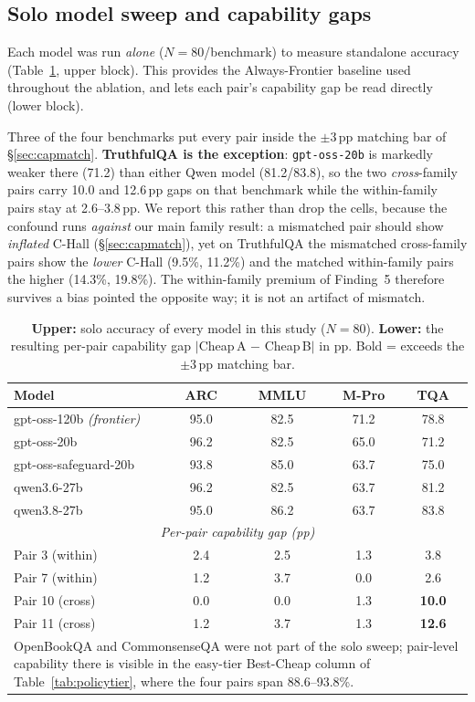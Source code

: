 \documentclass[conference]{IEEEtran}
\begin{document}
\subsection{Solo model sweep and capability gaps}
Each model was run \textit{alone} ($N=80$/benchmark) to measure standalone
accuracy (Table~\ref{tab:solo}, upper block). This provides the Always-Frontier
baseline used throughout the ablation, and lets each pair's capability gap be
read directly (lower block).

Three of the four benchmarks put every pair inside the $\pm3$\,pp matching bar of
\S\ref{sec:capmatch}. \textbf{TruthfulQA is the exception}: \texttt{gpt-oss-20b}
is markedly weaker there (71.2) than either Qwen model (81.2/83.8), so the two
\textit{cross}-family pairs carry 10.0 and 12.6\,pp gaps on that benchmark while
the within-family pairs stay at 2.6--3.8\,pp. We report this rather than drop the
cells, because the confound runs \textit{against} our main family result: a
mismatched pair should show \textit{inflated} C-Hall (\S\ref{sec:capmatch}), yet
on TruthfulQA the mismatched cross-family pairs show the \textit{lower} C-Hall
(9.5\%, 11.2\%) and the matched within-family pairs the higher (14.3\%, 19.8\%).
The within-family premium of Finding~5 therefore survives a bias pointed the
opposite way; it is not an artifact of mismatch.

\begin{table}[!t]
\caption{\textbf{Upper:} solo accuracy of every model in this study ($N=80$).
\textbf{Lower:} the resulting per-pair capability gap $|$Cheap\,A $-$ Cheap\,B$|$
in pp. Bold = exceeds the $\pm3$\,pp matching bar.}
\label{tab:solo}
\renewcommand{\arraystretch}{1.15}
\begin{tabular}{l c c c c}
\toprule
\textbf{Model} & \textbf{ARC} & \textbf{MMLU} & \textbf{M-Pro} & \textbf{TQA} \\
\midrule
gpt-oss-120b \textit{(frontier)} & 95.0 & 82.5 & 71.2 & 78.8 \\
\midrule
gpt-oss-20b & 96.2 & 82.5 & 65.0 & 71.2 \\
gpt-oss-safeguard-20b & 93.8 & 85.0 & 63.7 & 75.0 \\
qwen3.6-27b & 96.2 & 82.5 & 63.7 & 81.2 \\
qwen3.8-27b & 95.0 & 86.2 & 63.7 & 83.8 \\
\midrule
\multicolumn{5}{c}{\textit{Per-pair capability gap (pp)}} \\
\midrule
Pair 3 (within) & 2.4 & 2.5 & 1.3 & 3.8 \\
Pair 7 (within) & 1.2 & 3.7 & 0.0 & 2.6 \\
Pair 10 (cross) & 0.0 & 0.0 & 1.3 & \textbf{10.0} \\
Pair 11 (cross) & 1.2 & 3.7 & 1.3 & \textbf{12.6} \\
\bottomrule
\multicolumn{5}{p{8.4cm}}{\footnotesize OpenBookQA and CommonsenseQA were not part of the solo sweep; pair-level capability there is visible in the easy-tier Best-Cheap column of Table~\ref{tab:policytier}, where the four pairs span 88.6--93.8\%.}
\end{tabular}
\end{table}
\end{document}
